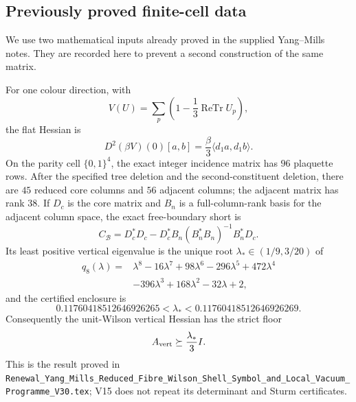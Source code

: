 \documentclass[11pt,oneside]{book}
\theoremstyle{definition}
\theoremstyle{remark}
\begin{document}
\subsection{Previously proved finite-cell data}

We use two mathematical inputs already proved in the supplied Yang--Mills
notes.  They are recorded here to prevent a second construction of the
same matrix.

\begin{input}
\label{inp:e8v15-parity}
For one colour direction, with
\[
  V(U)=\sum_p\left(1-\frac13\operatorname{ReTr}U_p\right),
\]
the flat Hessian is
\[
 D^2(\beta V)(0)[a,b]=\frac{\beta}{3}
       \langle d_1a,d_1b\rangle .
\]
On the parity cell \(\{0,1\}^4\), the exact integer incidence matrix has
\(96\) plaquette rows.  After the specified tree deletion and the
second-constituent deletion, there are \(45\) reduced core columns and
\(56\) adjacent columns; the adjacent matrix has rank \(38\).  If
\(D_c\) is the core matrix and \(B_n\) is a full-column-rank basis for
the adjacent column space, the exact free-boundary short is
\[
 C_{\mathcal B}
 =D_c^*D_c-D_c^*B_n(B_n^*B_n)^{-1}B_n^*D_c .
\]
Its least positive vertical eigenvalue is the unique root
\(\lambda_*\in(1/9,3/20)\) of
\[
\begin{split}
q_8(\lambda)={}&\lambda^8-16\lambda^7+98\lambda^6-296\lambda^5
 +472\lambda^4\\
&-396\lambda^3+168\lambda^2-32\lambda+2,
\end{split}
\]
and the certified enclosure is
\[
0.11760418512646926265
 <\lambda_*<
0.11760418512646926269.
\]
Consequently the unit-Wilson vertical Hessian has the strict floor
\[
                 A_{\rm vert}\succeq \frac{\lambda_*}{3}I.
\]
This is the result proved in
\texttt{Renewal\_Yang\_Mills\_Reduced\_Fibre\_Wilson\_Shell\_Symbol\_and\_Local\_Vacuum\_Programme\_V30.tex};
V15 does not repeat its determinant and Sturm certificates.
\end{input}
\end{document}
